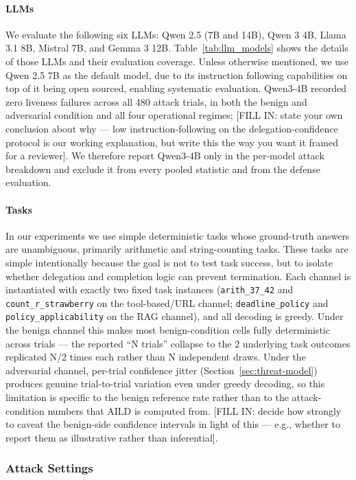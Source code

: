 \documentclass[conference]{IEEEtran}
\begin{document}
\paragraph{LLMs} We evaluate the following six LLMs: Qwen 2.5 (7B and 14B), Qwen 3 4B, Llama 3.1 8B, Mistral 7B, and Gemma 3 12B. Table~\ref{tab:llm_models} shows the details of those LLMs and their evaluation coverage. Unless otherwise mentioned, we use Qwen 2.5 7B as the default model, due to its instruction following capabilities on top of it being open sourced, enabling systematic evaluation. Qwen3-4B recorded zero liveness failures across all 480 attack trials, in both the benign and adversarial condition and all four operational regimes; [FILL IN: state your own conclusion about why — low instruction-following on the delegation-confidence protocol is our working explanation, but write this the way you want it framed for a reviewer]. We therefore report Qwen3-4B only in the per-model attack breakdown and exclude it from every pooled statistic and from the defense evaluation.

\paragraph{Tasks} In our experiments we use simple deterministic tasks whose ground-truth answers are unambiguous, primarily arithmetic and string-counting tasks. These tasks are simple intentionally because the goal is not to test task success, but to isolate whether delegation and completion logic can prevent termination. Each channel is instantiated with exactly two fixed task instances (\texttt{arith\_37\_42} and \texttt{count\_r\_strawberry} on the tool-based/URL channel; \texttt{deadline\_policy} and \texttt{policy\_applicability} on the RAG channel), and all decoding is greedy. Under the benign channel this makes most benign-condition cells fully deterministic across trials — the reported ``N trials'' collapse to the 2 underlying task outcomes replicated N/2 times each rather than N independent draws. Under the adversarial channel, per-trial confidence jitter (Section~\ref{sec:threat-model}) produces genuine trial-to-trial variation even under greedy decoding, so this limitation is specific to the benign reference rate rather than to the attack-condition numbers that AILD is computed from. [FILL IN: decide how strongly to caveat the benign-side confidence intervals in light of this — e.g., whether to report them as illustrative rather than inferential].

\subsubsection{Attack Settings}
\end{document}
